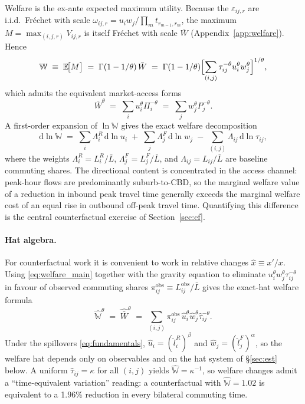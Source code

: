 \documentclass[12pt]{article}
\newcommand{\Lbar}{\bar L}
\newcommand{\Wbar}{\bar W}
\newcommand{\tijk}{\tau_{ij}}
\newcommand{\obs}{\mathrm{obs}}
\begin{document}
Welfare is the ex-ante expected maximum utility.  Because the
$\varepsilon_{ij,r}$ are i.i.d.\ Fr\'echet with scale $\omega_{ij,r}=
u_iw_j/\prod_m t_{r_{m-1},r_m}$, the maximum
$M=\max_{(i,j,r)}V_{ij,r}$ is itself Fr\'echet with scale
$\Wbar$ (Appendix~\ref{app:welfare}).  Hence
\begin{equation}
  \mathbb W
  \;\equiv\;\mathbb E\!\bigl[M\bigr]
  \;=\;\Gamma(1-1/\theta)\,\Wbar
  \;=\;\Gamma(1-1/\theta)\Bigl[\sum_{(i,j)}\tijk^{-\theta}u_i^{\theta}w_j^{\theta}\Bigr]^{1/\theta},
  \label{eq:welfare_main}
\end{equation}
which admits the equivalent market-access forms
\begin{equation}
  \Wbar^{\theta}
  \;=\;\sum_{i}u_i^{\theta}\Pi_i^{-\theta}
  \;=\;\sum_{j}w_j^{\theta}P_j^{-\theta}.
  \label{eq:welfare_MA}
\end{equation}
A first-order expansion of $\ln\mathbb W$ gives the exact welfare
decomposition
\begin{equation}
  \mathrm d\ln\mathbb W
  \;=\;\sum_{i}\Lambda_i^R\,\mathrm d\ln u_i
  \;+\;\sum_{j}\Lambda_j^F\,\mathrm d\ln w_j
  \;-\;\sum_{(i,j)}\Lambda_{ij}\,\mathrm d\ln\tijk,
  \label{eq:welfare_decomp}
\end{equation}
where the weights $\Lambda_i^R=L_i^R/\Lbar$, $\Lambda_j^F=L_j^F/\Lbar$,
and $\Lambda_{ij}=L_{ij}/\Lbar$ are baseline commuting shares.  The
directional content is concentrated in the access channel: peak-hour
flows are predominantly suburb-to-CBD, so the
marginal welfare value of a reduction in inbound peak travel time
generally exceeds the marginal welfare cost of an equal rise in
outbound off-peak travel time.  Quantifying this difference is the
central counterfactual exercise of Section~\ref{sec:cf}.

\paragraph{Hat algebra.}
For counterfactual work it is convenient to work in relative changes
$\hat x\equiv x'/x$.  Using \eqref{eq:welfare_main} together with the
gravity equation to eliminate $u_i^{\theta}w_j^{\theta}\tijk^{-\theta}$
in favour of observed commuting shares
$\pi_{ij}^{\obs}\equiv L_{ij}^{\obs}/\Lbar$ gives the exact-hat
welfare formula
\begin{equation}
  \hat{\mathbb W}^{\theta}
  \;=\;\hat{\Wbar}^{\theta}
  \;=\;\sum_{(i,j)}\pi_{ij}^{\obs}\,\hat u_i^{\theta}\hat w_j^{\theta}\hat\tau_{ij}^{-\theta}.
  \label{eq:welfare_hat}
\end{equation}
Under the spillovers \eqref{eq:fundamentals},
$\hat u_i=(\hat l_i^R)^{\beta}$ and
$\hat w_j=(\hat l_j^F)^{\alpha}$, so the welfare hat depends only on
observables and on the hat system of \S\ref{sec:est} below.  A
uniform $\hat\tau_{ij}=\kappa$ for all $(i,j)$ yields
$\hat{\mathbb W}=\kappa^{-1}$, so welfare changes admit a
``time-equivalent variation'' reading: a counterfactual with
$\hat{\mathbb W}=1.02$ is equivalent to a 1.96\% reduction in every
bilateral commuting time.
\end{document}
